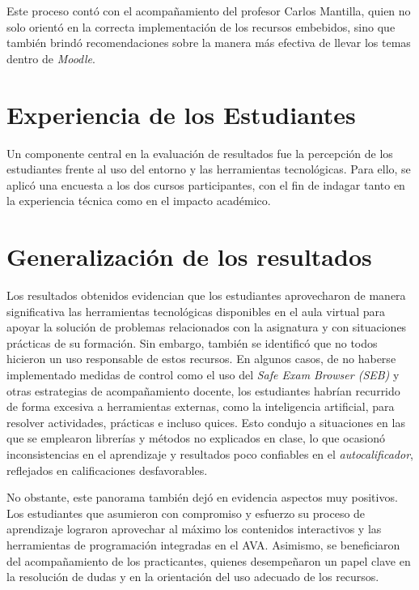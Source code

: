 \documentclass[letter,oneside,12pt,spanish]{report}
\begin{document}
Este proceso contó con el acompañamiento del profesor Carlos Mantilla, quien no solo orientó en la correcta implementación de los recursos embebidos, sino que también brindó recomendaciones sobre la manera más efectiva de llevar los temas dentro de \textit{Moodle}.

\section{Experiencia de los Estudiantes}

Un componente central en la evaluación de resultados fue la percepción de los estudiantes frente al uso del entorno y las herramientas tecnológicas. Para ello, se aplicó una encuesta a los dos cursos participantes, con el fin de indagar tanto en la experiencia técnica como en el impacto académico.

\section{Generalización de los resultados}

Los resultados obtenidos evidencian que los estudiantes aprovecharon de manera significativa las herramientas tecnológicas disponibles en el aula virtual para apoyar la solución de problemas relacionados con la asignatura y con situaciones prácticas de su formación. Sin embargo, también se identificó que no todos hicieron un uso responsable de estos recursos. En algunos casos, de no haberse implementado medidas de control como el uso del \textit{Safe Exam Browser (SEB)} y otras estrategias de acompañamiento docente, los estudiantes habrían recurrido de forma excesiva a herramientas externas, como la inteligencia artificial, para resolver actividades, prácticas e incluso quices. Esto condujo a situaciones en las que se emplearon librerías y métodos no explicados en clase, lo que ocasionó inconsistencias en el aprendizaje y resultados poco confiables en el \textit{autocalificador}, reflejados en calificaciones desfavorables.

No obstante, este panorama también dejó en evidencia aspectos muy positivos. Los estudiantes que asumieron con compromiso y esfuerzo su proceso de aprendizaje lograron aprovechar al máximo los contenidos interactivos y las herramientas de programación integradas en el AVA. Asimismo, se beneficiaron del acompañamiento de los practicantes, quienes desempeñaron un papel clave en la resolución de dudas y en la orientación del uso adecuado de los recursos.
\end{document}
